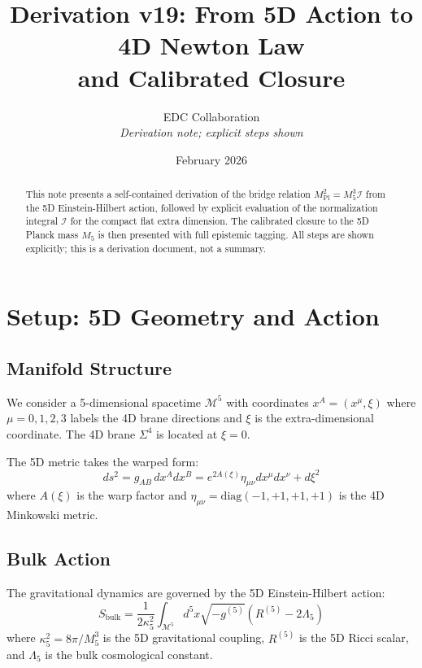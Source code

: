 \documentclass[11pt,a4paper]{article}
\title{Derivation v19: From 5D Action to 4D Newton Law\\
and Calibrated Closure}
\author{EDC Collaboration\\[3pt]
\small\textit{Derivation note; explicit steps shown}}
\date{February 2026}
\newcommand{\Mpl}{M_{\mathrm{Pl}}}
\newcommand{\Mfive}{M_5}
\newcommand{\calI}{\mathcal{I}}
\newcommand{\kfive}{\kappa_5}
\begin{document}
\maketitle

\begin{abstract}
This note presents a self-contained derivation of the bridge relation
$\Mpl^2 = \Mfive^3 \calI$ from the 5D Einstein-Hilbert action, followed by
explicit evaluation of the normalization integral $\calI$ for the compact flat
extra dimension. The calibrated closure to the 5D Planck mass $\Mfive$ is then
presented with full epistemic tagging. All steps are shown explicitly; this is
a derivation document, not a summary.
\end{abstract}

\section{Setup: 5D Geometry and Action}

\subsection{Manifold Structure}

We consider a 5-dimensional spacetime $\mathcal{M}^5$ with coordinates
$x^A = (x^\mu, \xi)$ where $\mu = 0,1,2,3$ labels the 4D brane directions
and $\xi$ is the extra-dimensional coordinate. The 4D brane $\Sigma^4$ is
located at $\xi = 0$.

The 5D metric takes the warped form:
\begin{equation}
ds^2 = g_{AB}\, dx^A dx^B = e^{2A(\xi)} \eta_{\mu\nu} dx^\mu dx^\nu + d\xi^2
\label{eq:metric-ansatz}
\end{equation}
where $A(\xi)$ is the warp factor and $\eta_{\mu\nu} = \mathrm{diag}(-1,+1,+1,+1)$
is the 4D Minkowski metric.

\subsection{Bulk Action}

The gravitational dynamics are governed by the 5D Einstein-Hilbert action:
\begin{equation}
S_{\mathrm{bulk}} = \frac{1}{2\kfive^2} \int_{\mathcal{M}^5} d^5x \sqrt{-g^{(5)}}
\left( R^{(5)} - 2\Lambda_5 \right)
\label{eq:bulk-action}
\end{equation}
where $\kfive^2 = 8\pi/\Mfive^3$ is the 5D gravitational coupling, $R^{(5)}$ is
the 5D Ricci scalar, and $\Lambda_5$ is the bulk cosmological constant.
\end{document}
